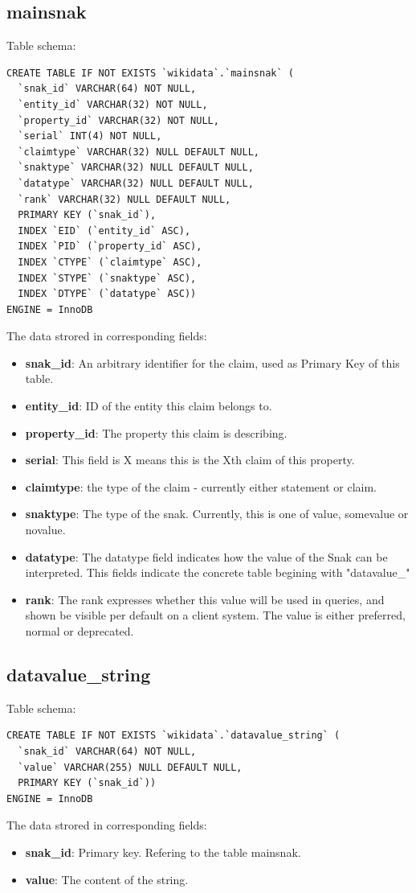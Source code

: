 \documentclass[12pt]{article}
\begin{document}
\subsection{mainsnak}
\lstset{language=SQL}
Table schema:
\begin{lstlisting}
CREATE TABLE IF NOT EXISTS `wikidata`.`mainsnak` (
  `snak_id` VARCHAR(64) NOT NULL,
  `entity_id` VARCHAR(32) NOT NULL,
  `property_id` VARCHAR(32) NOT NULL,
  `serial` INT(4) NOT NULL,
  `claimtype` VARCHAR(32) NULL DEFAULT NULL,
  `snaktype` VARCHAR(32) NULL DEFAULT NULL,
  `datatype` VARCHAR(32) NULL DEFAULT NULL,
  `rank` VARCHAR(32) NULL DEFAULT NULL,
  PRIMARY KEY (`snak_id`),
  INDEX `EID` (`entity_id` ASC),
  INDEX `PID` (`property_id` ASC),
  INDEX `CTYPE` (`claimtype` ASC),
  INDEX `STYPE` (`snaktype` ASC),
  INDEX `DTYPE` (`datatype` ASC))
ENGINE = InnoDB
\end{lstlisting}
The data strored in corresponding fields:
\begin{itemize}
\item \textbf{snak\_id}: An arbitrary identifier for the claim, used as Primary Key of this table.
\item \textbf{entity\_id}: ID of the entity this claim belongs to.
\item \textbf{property\_id}: The property this claim is describing.
\item \textbf{serial}: This field is X means this is the Xth claim of this property.
\item \textbf{claimtype}: the type of the claim - currently either statement or claim.
\item \textbf{snaktype}: The type of the snak. Currently, this is one of value, somevalue or novalue.
\item \textbf{datatype}: The datatype field indicates how the value of the Snak can be interpreted. This fields indicate the concrete table begining with "datavalue\_"
\item \textbf{rank}: The rank expresses whether this value will be used in queries, and shown be visible per default on a client system. The value is either preferred, normal or deprecated.
\end{itemize}
\subsection{datavalue\_string}
\lstset{language=SQL}
Table schema:
\begin{lstlisting}
CREATE TABLE IF NOT EXISTS `wikidata`.`datavalue_string` (
  `snak_id` VARCHAR(64) NOT NULL,
  `value` VARCHAR(255) NULL DEFAULT NULL,
  PRIMARY KEY (`snak_id`))
ENGINE = InnoDB
\end{lstlisting}
The data strored in corresponding fields:
\begin{itemize}
\item \textbf{snak\_id}: Primary key. Refering to the table mainsnak.
\item \textbf{value}: The content of the string.
\end{itemize}
\end{document}
